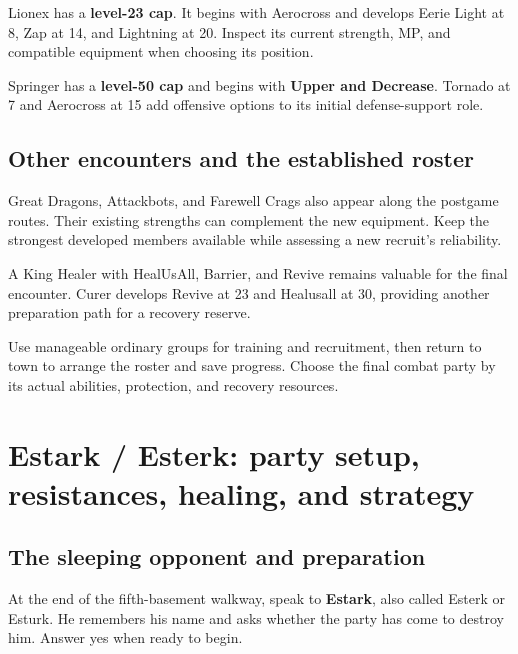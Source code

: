 Lionex has a \textbf{level-23 cap}. It begins with
Aerocross and develops Eerie Light at 8, Zap at 14,
and Lightning at 20. Inspect its current strength,
MP, and compatible equipment when choosing its position.

Springer has a \textbf{level-50 cap} and begins with
\textbf{Upper and Decrease}. Tornado at 7 and Aerocross
at 15 add offensive options to its initial defense-support
role.

\subsection*{Other encounters and the established roster}

Great Dragons, Attackbots, and Farewell Crags also appear
along the postgame routes. Their existing strengths can
complement the new equipment. Keep the strongest developed
members available while assessing a new recruit's reliability.

A King Healer with HealUsAll, Barrier, and Revive remains
valuable for the final encounter. Curer develops Revive
at 23 and Healusall at 30, providing another preparation
path for a recovery reserve.

Use manageable ordinary groups for training and recruitment,
then return to town to arrange the roster and save progress.
Choose the final combat party by its actual abilities,
protection, and recovery resources.

\section{Estark / Esterk: party setup, resistances, healing, and strategy}

\subsection*{The sleeping opponent and preparation}


At the end of the fifth-basement walkway, speak to
\textbf{Estark}, also called Esterk or Esturk.
He remembers his name and asks whether the party has
come to destroy him. Answer yes when ready to begin.

